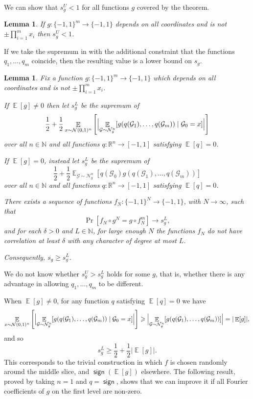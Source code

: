 \documentclass{article}
\newtheorem{lemma}[theorem]{Lemma}
\theoremstyle{definition}
\theoremstyle{remark}
\DeclareMathOperator*{\E}{\mathbb{E}}
\providecommand{\cG}{\mathcal{G}}
\providecommand{\normal}{\mathcal{N}}
\providecommand{\normalg}[1]{\normal_{#1}}
\providecommand{\stdnormal}{\normal(0,1)}
\DeclareMathOperator{\sgn}{\mathsf{sign}}
\renewcommand\geq{\geqslant}
\begin{document}
We can show that $s_g^U < 1$ for all functions $g$ covered by the theorem.

\begin{lemma} \label{lem:sg-ub}
If $g\colon \{-1,1\}^m \to \{-1,1\}$ depends on all coordinates and is not $\pm \prod_{i=1}^m x_i$ then $s_g^U < 1$.
\end{lemma}

If we take the supremum in  with the additional constraint that the functions $q_1,\ldots,q_m$ coincide, then the resulting value is a lower bound on $s_g$.

\begin{lemma} \label{lem:sg-lb}
Fix a function $g\colon \{-1,1\}^m \to \{-1,1\}$ which depends on all coordinates and is not $\pm \prod_{i=1}^m x_i$.

If $\E[g] \neq 0$ then let $s_g^L$ be the supremum of
\[
 \frac{1}{2} + \frac{1}{2}
 \E_{x \sim \stdnormal^n}
 \left[\Bigl|
 \E_{\cG \sim \normalg{g}^n}[g(q(\cG_1), \ldots, q(\cG_m)) \mid \cG_0 = x]
 \Bigr|\right]
\]
over all $n \in \mathbb{N}$ and all functions $q\colon \mathbb{R}^n \to [-1,1]$ satisfying $\E[q] = 0$.

If $\E[g] = 0$, instead let $s_g^L$ be the supremum of
\[
 \frac{1}{2} + \frac{1}{2}
 \E_{\cG \sim \normalg{g}^n}[q(\cG_0) g(q(\cG_1), \ldots, q(\cG_m))]
\]
over all $n \in \mathbb{N}$ and all functions $q\colon \mathbb{R}^n \to [-1,1]$ satisfying $\E[q] = 0$.

There exists a sequence of functions $f_N\colon \{-1,1\}^N \to \{-1,1\}$, with $N \to \infty$, such that
\[
 \Pr[f_N \circ g^N = g \circ f_N^m] \longrightarrow s^L_g,
\]
and for each $\delta > 0$ and $L \in \mathbb{N}$, for large enough $N$ the functions $f_N$ do not have correlation at least $\delta$ with any character of degree at most $L$.

Consequently, $s_g \geq s_g^L$.
\end{lemma}

\noindent We do not know whether $s_g^U > s_g^L$ holds for some $g$, that is, whether there is any advantage in allowing $q_1,\ldots,q_m$ to be different.

When $\E[g] \neq 0$, for any function $q$ satisfying $\E[q] = 0$ we have
\[
 \E_{x \sim \stdnormal^n}
 \left[\Bigl|
 \E_{\cG \sim \normalg{g}^n}[g(q(\cG_1), \ldots, q(\cG_m)) \mid \cG_0 = x]
 \Bigr|\right] \geq
 \Bigl|\E_{\cG \sim \normalg{g}^n}[g(q(\cG_1), \ldots, q(\cG_m))]\Bigr| = |\E[g]|,
\]
and so
\[
 s_g^L \geq \frac{1}{2} + \frac{1}{2} |\E[g]|.
\]
This corresponds to the trivial construction in which $f$ is chosen randomly around the middle slice, and $\sgn(\E[g])$ elsewhere. The following result, proved by taking $n = 1$ and $q = \sgn$, shows that we can improve it if all Fourier coefficients of $g$ on the first level are non-zero.
\end{document}
